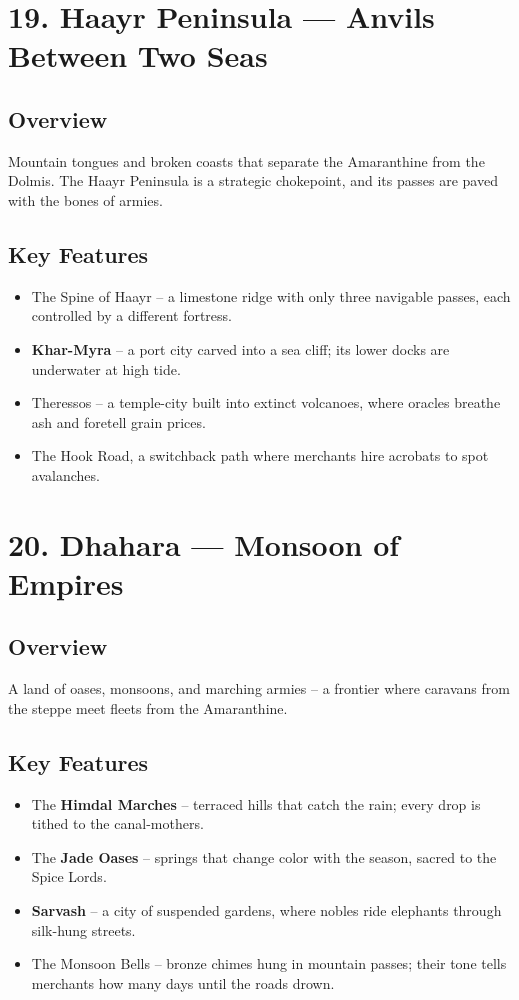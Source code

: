 \documentclass[11pt]{article}
\begin{document}
\section*{19. Haayr Peninsula --- Anvils Between Two Seas}

\subsection*{Overview}
Mountain tongues and broken coasts that separate the Amaranthine from the Dolmis. The Haayr Peninsula is a strategic chokepoint, and its passes are paved with the bones of armies.

\subsection*{Key Features}
\begin{itemize}[leftmargin=*]
    \item The Spine of Haayr -- a limestone ridge with only three navigable passes, each controlled by a different fortress.
    \item \textbf{Khar-Myra} -- a port city carved into a sea cliff; its lower docks are underwater at high tide.
    \item Theressos -- a temple-city built into extinct volcanoes, where oracles breathe ash and foretell grain prices.
    \item The Hook Road, a switchback path where merchants hire acrobats to spot avalanches.
\end{itemize}

\section*{20. Dhahara --- Monsoon of Empires}

\subsection*{Overview}
A land of oases, monsoons, and marching armies -- a frontier where caravans from the steppe meet fleets from the Amaranthine.

\subsection*{Key Features}
\begin{itemize}[leftmargin=*]
    \item The \textbf{Himdal Marches} -- terraced hills that catch the rain; every drop is tithed to the canal-mothers.
    \item The \textbf{Jade Oases} -- springs that change color with the season, sacred to the Spice Lords.
    \item \textbf{Sarvash} -- a city of suspended gardens, where nobles ride elephants through silk-hung streets.
    \item The Monsoon Bells -- bronze chimes hung in mountain passes; their tone tells merchants how many days until the roads drown.
\end{itemize}
\end{document}
